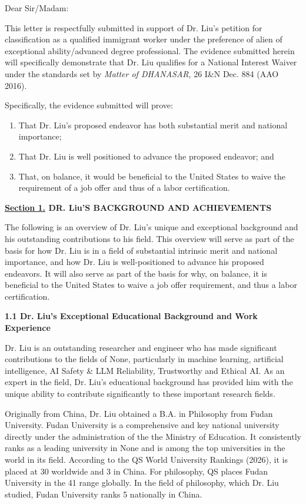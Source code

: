 \documentclass{article}
\begin{document}
Dear Sir/Madam:

This letter is respectfully submitted in support of Dr. Liu's petition for classification as a qualified immigrant worker under the preference of alien of exceptional ability/advanced degree professional. The evidence submitted herein will specifically demonstrate that Dr. Liu qualifies for a National Interest Waiver under the standards set by \textit{Matter of DHANASAR}, 26 I\&N Dec. 884 (AAO 2016).

Specifically, the evidence submitted will prove:
\begin{enumerate}
    \item That Dr. Liu's proposed endeavor has both substantial merit and national importance;
    \item That Dr. Liu is well positioned to advance the proposed endeavor; and
    \item That, on balance, it would be beneficial to the United States to waive the requirement of a job offer and thus of a labor certification.
\end{enumerate}

\clearpage





{\bf \underline{Section 1.} DR. Liu'S BACKGROUND AND ACHIEVEMENTS}

The following is an overview of Dr. Liu's unique and exceptional background and his outstanding contributions to his field. This overview will serve as part of the basis for how Dr. Liu is in a field of substantial intrinsic merit and national importance, and how Dr. Liu is well-positioned to advance his proposed endeavors. It will also serve as part of the basis for why, on balance, it is beneficial to the United States to waive a job offer requirement, and thus a labor certification.

{\bf 1.1 Dr. Liu's Exceptional Educational Background and Work Experience}

Dr. Liu is an outstanding researcher and engineer who has made significant contributions to the fields of None, particularly in machine learning, artificial intelligence, AI Safety \& LLM Reliability, Trustworthy and Ethical AI. As an expert in the field, Dr. Liu's educational background has provided him with the unique ability to contribute significantly to these important research fields.

Originally from China, Dr. Liu obtained a B.A. in Philosophy from Fudan University. Fudan University is a comprehensive and key national university directly under the administration of the the Ministry of Education. It consistently ranks as a leading university in None and is among the top universities in the world in its field. According to the QS World University Rankings (2026), it is placed at 30 worldwide and 3 in China. For philosophy, QS places Fudan University in the 41 range globally. In the field of philosophy, which Dr. Liu studied, Fudan University ranks 5 nationally in China.
\end{document}
